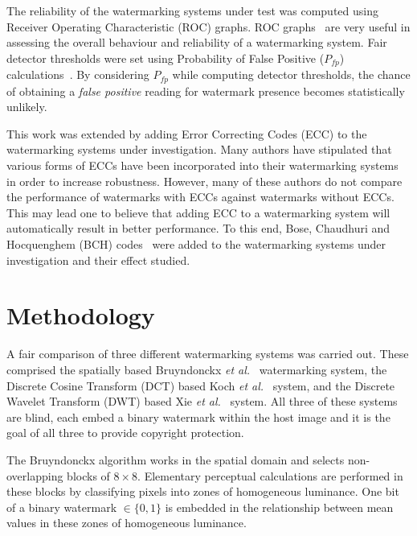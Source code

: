 \documentclass[10pt,twocolumn]{article}
\begin{document}
The reliability of the watermarking systems under test was computed using Receiver Operating Characteristic (ROC) graphs. 
ROC graphs~\cite{rocErk98}
are very useful in assessing the overall behaviour and reliability of a watermarking system.
Fair detector thresholds were set using Probability of False Positive ($P_{\mathit fp}$) calculations~\cite{kundurPfp}. 
By considering $P_{\mathit fp}$ while computing detector thresholds, the chance of obtaining a \emph{false positive}
reading for watermark presence becomes statistically unlikely. 

This work was extended by adding Error Correcting Codes (ECC) to the watermarking systems under investigation. 
Many authors \cite{marvelPap, 
wangPap, 
herrPap, 
egg1Pap} 
have stipulated that various forms of ECCs have been incorporated
into their watermarking systems in order to increase robustness. 
However, many of these authors
do not compare the performance of watermarks with ECCs against watermarks without ECCs. This may lead
one to believe that adding ECC to a watermarking system will automatically result in better performance. 
To this end, Bose, Chaudhuri and Hocquenghem (BCH) codes~\cite{BKX:bchPlessBk} 
were added to the watermarking systems under investigation and their effect 
studied.


\section{Methodology}
\label{sec:meth}
A fair comparison of three different watermarking systems was carried out.
These comprised the spatially based Bruyndonckx \emph{et al.}~\cite{bruyn1Pap} watermarking system, 
the Discrete Cosine Transform (DCT) based Koch \emph{et al.}~\cite{koch1Pap} system, and 
the Discrete Wavelet Transform (DWT) based Xie \emph{et al.}~\cite{xiePap} system.  All three of these systems are blind, each embed a binary watermark within the 
host image and it is the goal of all three to provide copyright protection.

The Bruyndonckx algorithm works in the spatial domain and selects non-overlapping blocks of $8 \times 8$. Elementary 
perceptual calculations are performed in these blocks by classifying pixels into zones of homogeneous luminance. One
bit of a binary watermark $\in\{0,1\}$ is embedded in the relationship between mean values in these zones of homogeneous 
luminance.
\end{document}
